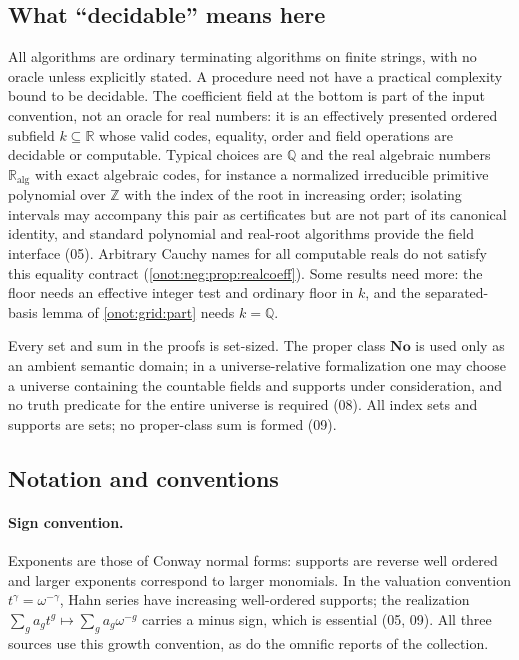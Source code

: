 \documentclass[11pt,oneside]{article}
\numberwithin{equation}{section}
\theoremstyle{definition}
\theoremstyle{remark}
\newcommand{\No}{\mathbf{No}}
\newcommand{\Z}{\mathbb Z}
\newcommand{\Q}{\mathbb Q}
\newcommand{\R}{\mathbb R}
\newcommand{\Ralg}{\R_{\mathrm{alg}}}
\begin{document}
\subsection{What ``decidable'' means here}\label{onot:sub:decidable}

All algorithms are ordinary terminating algorithms on finite strings, with no
oracle unless explicitly stated. A procedure need not have a practical
complexity bound to be decidable. The coefficient field at the bottom is part of
the input convention, not an oracle for real numbers: it is an effectively
presented ordered subfield $k\subseteq\R$ whose valid codes, equality, order and
field operations are decidable or computable. Typical choices are $\Q$ and the
real algebraic numbers $\Ralg$ with exact algebraic codes, for instance a
normalized irreducible primitive polynomial over $\Z$ with the index of the root
in increasing order; isolating intervals may accompany this pair as certificates
but are not part of its canonical identity, and standard polynomial and
real-root algorithms provide the field interface (05). Arbitrary Cauchy names for
all computable reals do not satisfy this equality contract
(\cref{onot:neg:prop:realcoeff}). Some results need more: the floor needs an
effective integer test and ordinary floor in $k$, and the separated-basis lemma
of \cref{onot:grid:part} needs $k=\Q$.

Every set and sum in the proofs is set-sized. The proper class $\No$ is used
only as an ambient semantic domain; in a universe-relative formalization one may
choose a universe containing the countable fields and supports under
consideration, and no truth predicate for the entire universe is required (08).
All index sets and supports are sets; no proper-class sum is formed (09).

\subsection{Notation and conventions}\label{onot:sub:conventions}

\paragraph{Sign convention.} Exponents are those of Conway normal forms:
supports are reverse well ordered and larger exponents correspond to larger
monomials. In the valuation convention $t^\gamma=\omega^{-\gamma}$, Hahn series
have increasing well-ordered supports; the realization
$\sum_ga_gt^g\mapsto\sum_ga_g\omega^{-g}$ carries a minus sign, which is
essential (05, 09). All three sources use this growth convention, as do the
omnific reports of the collection.
\end{document}
